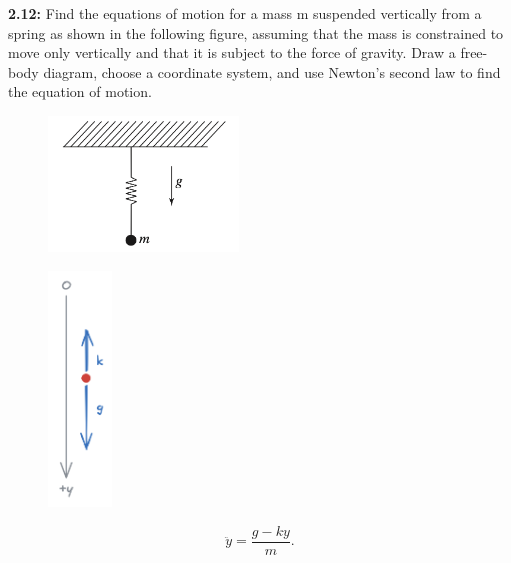 \begin{homeworkProblem}

	\textbf{2.12:} Find the equations of motion for a mass m suspended vertically from a spring as shown in the following figure, assuming that the mass is constrained to move only vertically and that it is subject to the force of gravity. Draw a free-body diagram, choose a coordinate system, and use Newton’s second law to find the equation of motion.

	\begin{figure}[ht]
		\begin{center}
			\includegraphics[width=0.45\textwidth]{images/01-2.12.png}
		\end{center}
	\end{figure}

	\solution

	\begin{figure}[ht]
		\begin{center}
			\includegraphics[width=0.15\textwidth]{images/solution 01-2.12.png}
		\end{center}
	\end{figure}

	\[
		\ddot{y} = \frac{g - ky}{m}
		.\]

\end{homeworkProblem}

